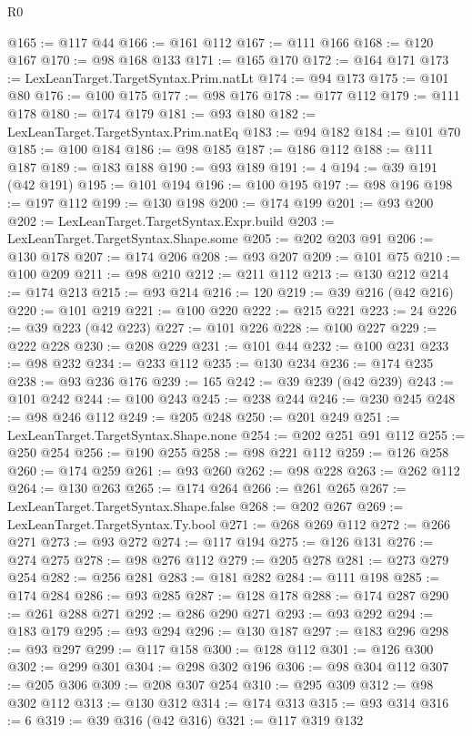 \begin{lexlean}{R0}
\begin{coremodule}
@165 := @117 @44
@166 := @161 @112
@167 := @111 @166
@168 := @120 @167
@170 := @98 @168 @133
@171 := @165 @170
@172 := @164 @171
@173 := LexLeanTarget.TargetSyntax.Prim.natLt
@174 := @94 @173
@175 := @101 @80
@176 := @100 @175
@177 := @98 @176
@178 := @177 @112
@179 := @111 @178
@180 := @174 @179
@181 := @93 @180
@182 := LexLeanTarget.TargetSyntax.Prim.natEq
@183 := @94 @182
@184 := @101 @70
@185 := @100 @184
@186 := @98 @185
@187 := @186 @112
@188 := @111 @187
@189 := @183 @188
@190 := @93 @189
@191 := 4
@194 := @39 @191 (@42 @191)
@195 := @101 @194
@196 := @100 @195
@197 := @98 @196
@198 := @197 @112
@199 := @130 @198
@200 := @174 @199
@201 := @93 @200
@202 := LexLeanTarget.TargetSyntax.Expr.build
@203 := LexLeanTarget.TargetSyntax.Shape.some
@205 := @202 @203 @91
@206 := @130 @178
@207 := @174 @206
@208 := @93 @207
@209 := @101 @75
@210 := @100 @209
@211 := @98 @210
@212 := @211 @112
@213 := @130 @212
@214 := @174 @213
@215 := @93 @214
@216 := 120
@219 := @39 @216 (@42 @216)
@220 := @101 @219
@221 := @100 @220
@222 := @215 @221
@223 := 24
@226 := @39 @223 (@42 @223)
@227 := @101 @226
@228 := @100 @227
@229 := @222 @228
@230 := @208 @229
@231 := @101 @44
@232 := @100 @231
@233 := @98 @232
@234 := @233 @112
@235 := @130 @234
@236 := @174 @235
@238 := @93 @236 @176
@239 := 165
@242 := @39 @239 (@42 @239)
@243 := @101 @242
@244 := @100 @243
@245 := @238 @244
@246 := @230 @245
@248 := @98 @246 @112
@249 := @205 @248
@250 := @201 @249
@251 := LexLeanTarget.TargetSyntax.Shape.none
@254 := @202 @251 @91 @112
@255 := @250 @254
@256 := @190 @255
@258 := @98 @221 @112
@259 := @126 @258
@260 := @174 @259
@261 := @93 @260
@262 := @98 @228
@263 := @262 @112
@264 := @130 @263
@265 := @174 @264
@266 := @261 @265
@267 := LexLeanTarget.TargetSyntax.Shape.false
@268 := @202 @267
@269 := LexLeanTarget.TargetSyntax.Ty.bool
@271 := @268 @269 @112
@272 := @266 @271
@273 := @93 @272
@274 := @117 @194
@275 := @126 @131
@276 := @274 @275
@278 := @98 @276 @112
@279 := @205 @278
@281 := @273 @279 @254
@282 := @256 @281
@283 := @181 @282
@284 := @111 @198
@285 := @174 @284
@286 := @93 @285
@287 := @128 @178
@288 := @174 @287
@290 := @261 @288 @271
@292 := @286 @290 @271
@293 := @93 @292
@294 := @183 @179
@295 := @93 @294
@296 := @130 @187
@297 := @183 @296
@298 := @93 @297
@299 := @117 @158
@300 := @128 @112
@301 := @126 @300
@302 := @299 @301
@304 := @298 @302 @196
@306 := @98 @304 @112
@307 := @205 @306
@309 := @208 @307 @254
@310 := @295 @309
@312 := @98 @302 @112
@313 := @130 @312
@314 := @174 @313
@315 := @93 @314
@316 := 6
@319 := @39 @316 (@42 @316)
@321 := @117 @319 @132

\end{coremodule}
\end{lexlean}
